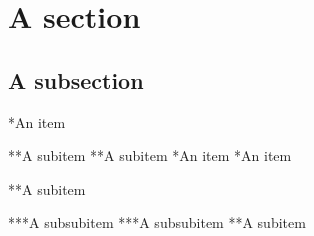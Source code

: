 \documentclass[a4paper]{article}
\begin{document}
    \tableofcontents
    \clearpage
    
    \section{A section}

    \subsection{A subsection}

    *An item

    **A subitem
    **A subitem
    *An item
    *An item

    **A subitem

    ***A subsubitem
    ***A subsubitem
    **A subitem

    \clearpage
    
    
    \clearpage
    \printglossaries
\end{document}
